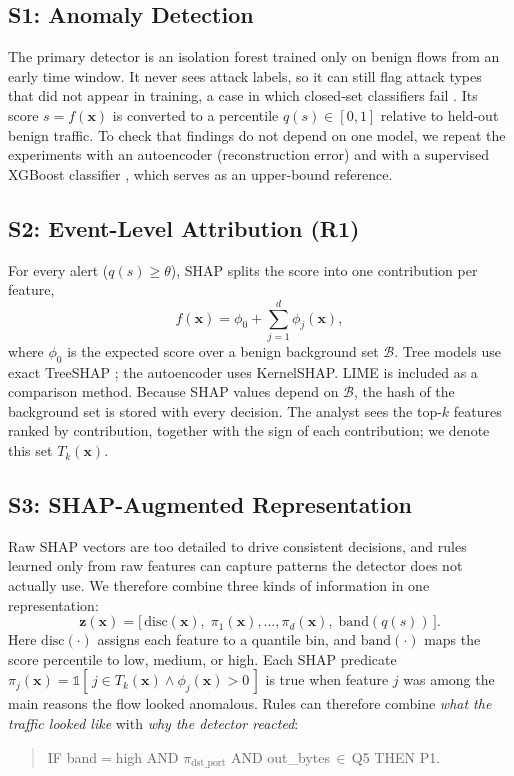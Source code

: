 \documentclass[journal]{IEEEtran}
\begin{document}
\subsection{S1: Anomaly Detection}
The primary detector is an isolation forest \cite{iforest} trained only on benign flows from an early time window. It never sees attack labels, so it can still flag attack types that did not appear in training, a case in which closed-set classifiers fail \cite{cytrex}. Its score $s=f(\mathbf{x})$ is converted to a percentile $q(s)\in[0,1]$ relative to held-out benign traffic. To check that findings do not depend on one model, we repeat the experiments with an autoencoder (reconstruction error) and with a supervised XGBoost classifier \cite{xgboost}, which serves as an upper-bound reference.

\subsection{S2: Event-Level Attribution (R1)}
For every alert ($q(s)\geq\theta$), SHAP splits the score into one contribution per feature,
\begin{equation}
f(\mathbf{x})=\phi_0+\textstyle\sum_{j=1}^{d}\phi_j(\mathbf{x}),
\end{equation}
where $\phi_0$ is the expected score over a benign background set $\mathcal{B}$. Tree models use exact TreeSHAP \cite{treeshap}; the autoencoder uses KernelSHAP. LIME \cite{lime} is included as a comparison method. Because SHAP values depend on $\mathcal{B}$, the hash of the background set is stored with every decision. The analyst sees the top-$k$ features ranked by contribution, together with the sign of each contribution; we denote this set $T_k(\mathbf{x})$.

\subsection{S3: SHAP-Augmented Representation}
Raw SHAP vectors are too detailed to drive consistent decisions, and rules learned only from raw features can capture patterns the detector does not actually use. We therefore combine three kinds of information in one representation:
\begin{equation}
\mathbf{z}(\mathbf{x})=\big[\,\mathrm{disc}(\mathbf{x}),\;\pi_1(\mathbf{x}),\dots,\pi_d(\mathbf{x}),\;\mathrm{band}(q(s))\,\big].
\end{equation}
Here $\mathrm{disc}(\cdot)$ assigns each feature to a quantile bin, and $\mathrm{band}(\cdot)$ maps the score percentile to low, medium, or high. Each SHAP predicate $\pi_j(\mathbf{x})=\mathbb{1}[\,j\in T_k(\mathbf{x})\wedge\phi_j(\mathbf{x})>0\,]$ is true when feature $j$ was among the main reasons the flow looked anomalous. Rules can therefore combine \emph{what the traffic looked like} with \emph{why the detector reacted}:
\begin{quote}\footnotesize
IF band$=$high AND $\pi_{\text{dst\_port}}$ AND out\_bytes$\,\in\,$Q5 THEN P1.
\end{quote}
\end{document}
